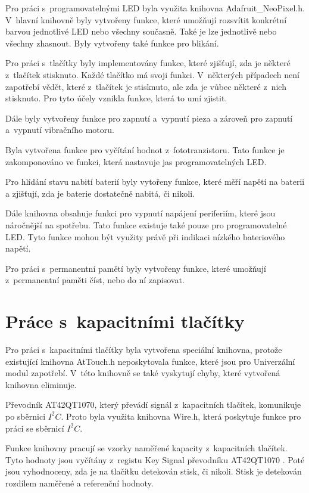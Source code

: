 Pro práci s~programovatelnými LED byla využita knihovna Adafruit\_NeoPixel.h. V~hlavní knihovně byly vytvořeny funkce, které umožňují rozsvítit konkrétní barvou jednotlivé LED nebo všechny současně. Také 
je lze jednotlivě nebo všechny zhasnout. Byly vytvořeny také funkce pro blikání. 

Pro práci s~tlačítky byly implementovány funkce, které zjišťují, zda je některé z~tlačítek stisknuto. Každé tlačítko má svoji funkci. V~některých případech není zapotřebí vědět, které z~tlačítek je stisknuto, 
ale zda je vůbec některé z~nich stisknuto. Pro tyto účely vznikla funkce, která to umí zjistit. 

Dále byly vytvořeny funkce pro zapnutí a~vypnutí pieza a zároveň pro zapnutí a~vypnutí vibračního motoru. 

Byla vytvořena funkce pro vyčítání hodnot z~fototranzistoru. Tato funkce je zakomponováno ve funkci, která nastavuje jas programovatelných LED.

Pro hlídání stavu nabití baterií byly vytořeny funkce, které měří napětí na baterii a zjišťují, zda je baterie dostatečně nabitá, či nikoli. 

Dále knihovna obsahuje funkci pro vypnutí napájení periferiím, které jsou náročnější na spotřebu. Tato funkce existuje také pouze pro programovatelné LED. Tyto funkce mohou být využity právě při indikaci 
nízkého bateriového napětí.

Pro práci s~permanentní pamětí byly vytvořeny funkce, které umožňují z~permanentní paměti číst, nebo do ní zapisovat. 

\section{Práce s~kapacitními tlačítky}
Pro práci s~kapacitními tlačítky byla vytvořena speciální knihovna, protože existující knihovna AtTouch.h neposkytovala funkce, které jsou pro Univerzální modul zapotřebí. V~této knihovně se také 
vyskytují chyby, které vytvořená knihovna eliminuje.

Převodník AT42QT1070, který převádí signál z~kapacitních tlačítek, komunikuje po sběrnici $I^2C$. Proto byla využita knihovna Wire.h, která poskytuje funkce pro práci se sběrnicí $I^2C$.

Funkce knihovny pracují se vzorky naměřené kapacity z~kapacitních tlačítek. Tyto hodnoty jsou vyčítány z~registu Key Signal převodníku AT42QT1070 \cite{conv_cap_but_AT42QT1070_dtsh}. Poté jsou vyhodnoceny, zda je na 
tlačítku detekován stisk, či nikoli. Stisk je detekován rozdílem naměřené a referenční hodnoty. 

